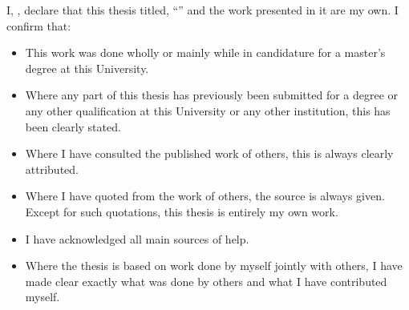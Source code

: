 \begin{declaration}

I, \authorname, declare that this thesis titled, ``\ttitle'' and the work presented in it are my own. I confirm that:

\begin{itemize}
\item This work was done wholly or mainly while in candidature for a master's degree at this University.

\item Where any part of this thesis has previously been submitted for a degree or any other qualification at this University or any other institution, this has been clearly stated.

\item Where I have consulted the published work of others, this is always clearly attributed.

\item Where I have quoted from the work of others, the source is always given. Except for such quotations, this thesis is entirely my own work.

\item I have acknowledged all main sources of help.

\item Where the thesis is based on work done by myself jointly with others, I have made clear exactly what was done by others and what I have contributed myself.
\end{itemize}

\end{declaration}
